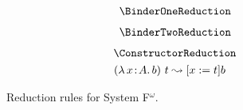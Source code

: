 
\begin{figure}
    \centering
    \begin{minipage}{0.5\textwidth}
        $$\BinderOneReduction$$
    \end{minipage}%
    \begin{minipage}{0.5\textwidth}
        $$\BinderTwoReduction$$
    \end{minipage}%
    $$\ConstructorReduction$$
    \begin{align*}
        ({\lambda}\, x\! : \! A.\, b)\ t &\leadsto [x := t]b
    \end{align*}
    \caption{Reduction rules for System F$^\omega$.}
    \label{fig:reduction_f}
\end{figure}


